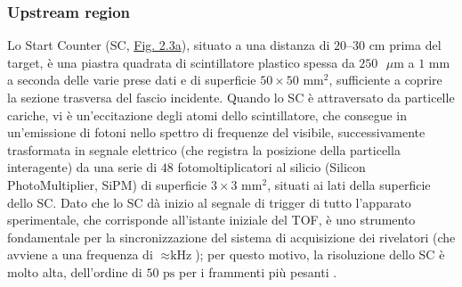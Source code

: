 \documentclass[12pt,a4paper,twoside]{report}
\begin{document}
	\subsubsection{Upstream region}
	Lo Start Counter (SC, \hyperref[fig:start_counter]{Fig. 2.3a}), situato a una distanza di $20$--$30\mbox{ cm}$ prima del target, è una piastra quadrata di scintillatore plastico spessa da $250\mbox{ }\mu\mbox{m}$ a $1\mbox{ mm}$ a seconda delle varie prese dati e di superficie $50\times50\mbox{ mm}^2$, sufficiente a coprire la sezione trasversa del fascio incidente. Quando lo SC è attraversato da particelle cariche, vi è un'eccitazione degli atomi dello scintillatore, che consegue in un'emissione di fotoni nello spettro di frequenze del visibile, successivamente trasformata in segnale elettrico (che registra la posizione della particella interagente) da una serie di $48$ fotomoltiplicatori al silicio (Silicon PhotoMultiplier, SiPM) di superficie $3\times3\mbox{ mm}^2$, situati ai lati della superficie dello SC. Dato che lo SC dà inizio al segnale di trigger di tutto l'apparato sperimentale, che corrisponde all'istante iniziale del TOF, è uno strumento fondamentale per la sincronizzazione del sistema di acquisizione dei rivelatori (che avviene a una frequenza di $\approx\mbox{kHz}$); per questo motivo, la risoluzione dello SC è molto alta, dell'ordine di $50\mbox{ ps}$ per i frammenti più pesanti \cite{foot_cdr,ubaldiArticle}.
	
\end{document}
